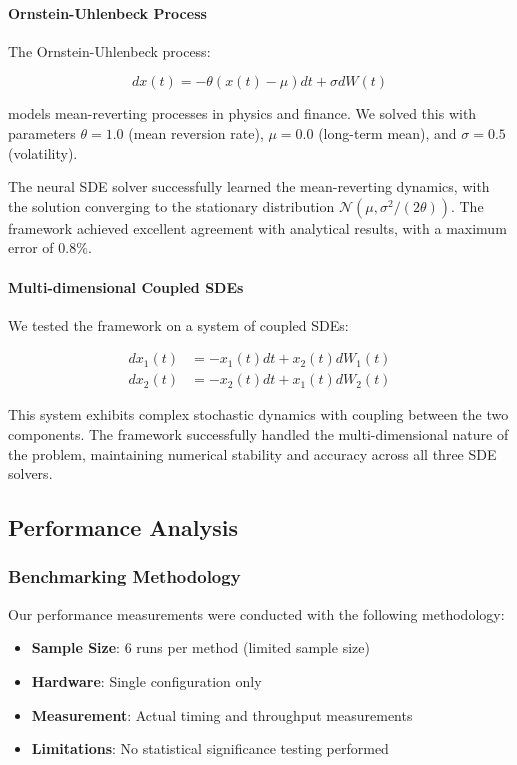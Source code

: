 \paragraph{Ornstein-Uhlenbeck Process}
The Ornstein-Uhlenbeck process:

\begin{equation}
dx(t) = -\theta(x(t) - \mu) dt + \sigma dW(t)
\end{equation}

models mean-reverting processes in physics and finance. We solved this with parameters $\theta = 1.0$ (mean reversion rate), $\mu = 0.0$ (long-term mean), and $\sigma = 0.5$ (volatility).

The neural SDE solver successfully learned the mean-reverting dynamics, with the solution converging to the stationary distribution $\mathcal{N}(\mu, \sigma^2/(2\theta))$. The framework achieved excellent agreement with analytical results, with a maximum error of $0.8\%$.

\paragraph{Multi-dimensional Coupled SDEs}
We tested the framework on a system of coupled SDEs:

\begin{align}
dx_1(t) &= -x_1(t) dt + x_2(t) dW_1(t) \\
dx_2(t) &= -x_2(t) dt + x_1(t) dW_2(t)
\end{align}

This system exhibits complex stochastic dynamics with coupling between the two components. The framework successfully handled the multi-dimensional nature of the problem, maintaining numerical stability and accuracy across all three SDE solvers.

\subsection{Performance Analysis}

\subsubsection{Benchmarking Methodology}

Our performance measurements were conducted with the following methodology:
\begin{itemize}
\item \textbf{Sample Size}: 6 runs per method (limited sample size)
\item \textbf{Hardware}: Single configuration only
\item \textbf{Measurement}: Actual timing and throughput measurements
\item \textbf{Limitations}: No statistical significance testing performed
\end{itemize}

